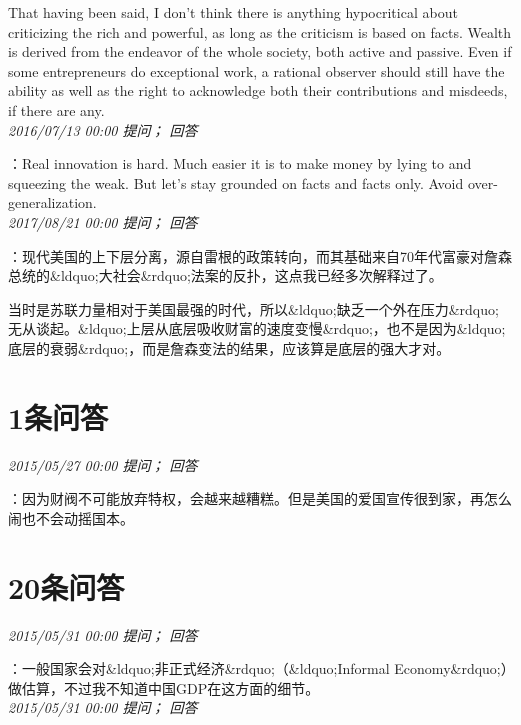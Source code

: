 \documentclass[twocolumn]{ctexart}
\begin{document}
That having been said, I don't think there is anything hypocritical about criticizing the rich and powerful, as long as the criticism is based on facts. Wealth is derived from the endeavor of the whole society, both active and passive. Even if some entrepreneurs do exceptional work, a rational observer should still have the ability as well as the right to acknowledge both their contributions and misdeeds, if there are any.\\

\textit{\hfill\noindent\small 2016/07/13 00:00 提问； 回答}

：Real innovation is hard. Much easier it is to make money by lying to and squeezing the weak. But let's stay grounded on facts and facts only. Avoid over-generalization.\\

\textit{\hfill\noindent\small 2017/08/21 00:00 提问； 回答}

：现代美国的上下层分离，源自雷根的政策转向，而其基础来自70年代富豪对詹森总统的\&ldquo;大社会\&rdquo;法案的反扑，这点我已经多次解释过了。

当时是苏联力量相对于美国最强的时代，所以\&ldquo;缺乏一个外在压力\&rdquo;无从谈起。\&ldquo;上层从底层吸收财富的速度变慢\&rdquo;，也不是因为\&ldquo;底层的衰弱\&rdquo;，而是詹森变法的结果，应该算是底层的强大才对。\\

\section{1条问答}

\textit{\hfill\noindent\small 2015/05/27 00:00 提问； 回答}

：因为财阀不可能放弃特权，会越来越糟糕。但是美国的爱国宣传很到家，再怎么闹也不会动摇国本。\\

\section{20条问答}

\textit{\hfill\noindent\small 2015/05/31 00:00 提问； 回答}

：一般国家会对\&ldquo;非正式经济\&rdquo;（\&ldquo;Informal Economy\&rdquo;）做估算，不过我不知道中国GDP在这方面的细节。\\

\textit{\hfill\noindent\small 2015/05/31 00:00 提问； 回答}
\end{document}
